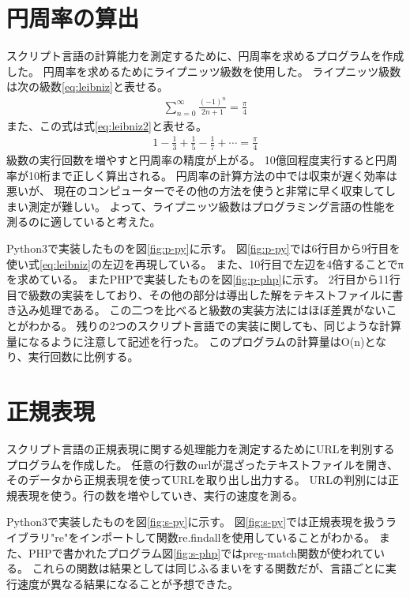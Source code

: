 \section{円周率の算出}
スクリプト言語の計算能力を測定するために、円周率を求めるプログラムを作成した。
円周率を求めるためにライプニッツ級数を使用した。
ライプニッツ級数は次の級数\ref{eq:leibniz}と表せる。
\begin{eqnarray} \label{eq:leibniz}
\sum_{n=0}^{\infty}\frac{(-1)^n}{2n+1}=\frac{\pi}{4}
\end{eqnarray}
また、この式は式\ref{eq:leibniz2}と表せる。
\begin{eqnarray} \label{eq:leibniz2}
1-\frac{1}{3}+\frac{1}{5}-\frac{1}{7}+\cdots=\frac{\pi}{4}
\end{eqnarray}
級数の実行回数を増やすと円周率の精度が上がる。
10億回程度実行すると円周率が10桁まで正しく算出される。
円周率の計算方法の中では収束が遅く効率は悪いが、
現在のコンピューターでその他の方法を使うと非常に早く収束してしまい測定が難しい。
よって、ライプニッツ級数はプログラミング言語の性能を測るのに適していると考えた。

Python3で実装したものを図\ref{fig:p-py}に示す。
図\ref{fig:p-py}では6行目から9行目を使い式\ref{eq:leibniz}の左辺を再現している。
また、10行目で左辺を4倍することでπを求めている。
またPHPで実装したものを図\ref{fig:p-php}に示す。
2行目から11行目で級数の実装をしており、その他の部分は導出した解をテキストファイルに書き込み処理である。
この二つを比べると級数の実装方法にはほぼ差異がないことがわかる。
残りの2つのスクリプト言語での実装に関しても、同じような計算量になるように注意して記述を行った。
このプログラムの計算量はO(n)となり、実行回数に比例する。

\section{正規表現}
スクリプト言語の正規表現に関する処理能力を測定するためにURLを判別するプログラムを作成した。
任意の行数のurlが混ざったテキストファイルを開き、そのデータから正規表現を使ってURLを取り出し出力する。
URLの判別には正規表現を使う。行の数を増やしていき、実行の速度を測る。

Python3で実装したものを図\ref{fig:s-py}に示す。
図\ref{fig:s-py}では正規表現を扱うライブラリ"re"をインポートして関数re.findallを使用していることがわかる。
また、PHPで書かれたプログラム図\ref{fig:s-php}ではpreg-match関数が使われている。
これらの関数は結果としては同じふるまいをする関数だが、言語ごとに実行速度が異なる結果になることが予想できた。

